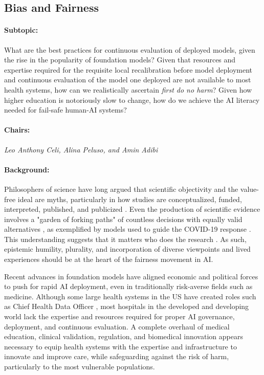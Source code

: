 \subsection{Bias and Fairness}

\paragraph{Subtopic:} What are the best practices for continuous evaluation of deployed models, given the rise in the popularity of foundation models? Given that resources and expertise required for the requisite local recalibration before model deployment and continuous evaluation of the model one deployed are not available to most health systems, how can we realistically ascertain \textit{first do no harm}? Given how higher education is notoriously slow to change, how do we achieve the AI literacy needed for fail-safe human-AI systems?

\paragraph{Chairs:‌}
\textit{Leo Anthony Celi, Alina Peluso, and Amin Adibi}

\paragraph{Background:}
Philosophers of science have long argued that scientific objectivity and the value-free ideal are myths, particularly in how studies are conceptualized, funded, interpreted, published, and publicized \citep{reiss_scientific_2020}. Even the production of scientific evidence involves a "garden of forking paths" of countless decisions with equally valid alternatives \citep{gelman_garden_2013}, as exemplified by models used to guide the COVID-19 response \citep{harvard_value_2021}. This understanding suggests that it matters who does the research \citep{charpignon_does_2024}. As such, epistemic humility, plurality, and incorporation of diverse viewpoints and lived experiences should be at the heart of the fairness movement in AI.

Recent advances in foundation models have aligned economic and political forces to push for rapid AI deployment, even in traditionally risk-averse fields such as medicine. Although some large health systems in the US have created roles such as Chief Health Data Officer \citep{beecy_chief_2024}, most hospitals in the developed and developing world lack the expertise and resources required for proper AI governance, deployment, and continuous evaluation. A complete overhaul of medical education, clinical validation, regulation, and biomedical innovation appears necessary to equip health systems with the expertise and infrastructure to innovate and improve care, while safeguarding against the risk of harm, particularly to the most vulnerable populations. 

